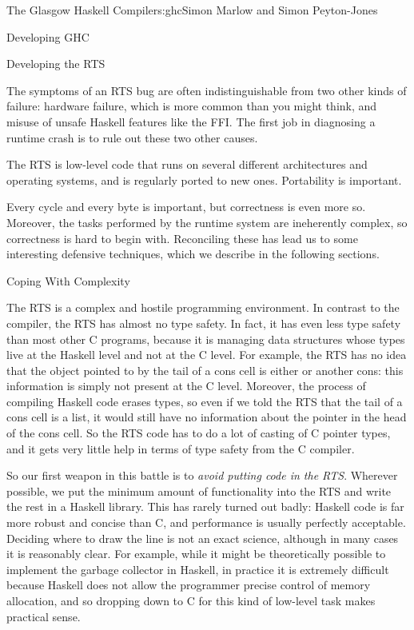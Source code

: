 \begin{aosachapter}{The Glasgow Haskell Compiler}{s:ghc}{Simon Marlow and Simon Peyton-Jones}
\begin{aosasect1}{Developing GHC}
\begin{aosasect2}{Developing the RTS}
\begin{aosaenumerate}
  The symptoms of an RTS bug are often indistinguishable from two
  other kinds of failure: hardware failure, which is more common than
  you might think, and misuse of unsafe Haskell features like the FFI.
  The first job in diagnosing a runtime crash is to rule out these two
  other causes.

\item The RTS is low-level code that runs on several different
  architectures and operating systems, and is regularly ported to new
  ones.  Portability is important.

\end{aosaenumerate}

Every cycle and every byte is important, but correctness is even more
so.  Moreover, the tasks performed by the runtime system are
ineherently complex, so correctness is hard to begin with.
Reconciling these has lead us to some interesting defensive
techniques, which we describe in the following sections.

\begin{aosasect3}{Coping With Complexity}
\label{s:rtsbugs}

The RTS is a complex and hostile programming environment.  In contrast
to the compiler, the RTS has almost no type safety.  In fact, it has
even less type safety than most other C programs, because it is
managing data structures whose types live at the Haskell level and not
at the C level.  For example, the RTS has no idea that the object
pointed to by the tail of a cons cell is either \code{[]} or another
cons: this information is simply not present at the C level.
Moreover, the process of compiling Haskell code erases types, so even
if we told the RTS that the tail of a cons cell is a list, it would
still have no information about the pointer in the head of the cons
cell.  So the RTS code has to do a lot of casting of C pointer types,
and it gets very little help in terms of type safety from the C
compiler.

So our first weapon in this battle is to \emph{avoid putting code in
  the RTS}.  Wherever possible, we put the minimum amount of
functionality into the RTS and write the rest in a Haskell library.
This has rarely turned out badly: Haskell code is far more robust and
concise than C, and performance is usually perfectly acceptable.
Deciding where to draw the line is not an exact science, although in
many cases it is reasonably clear.  For example, while it might be
theoretically possible to implement the garbage collector in Haskell,
in practice it is extremely difficult because Haskell does not allow
the programmer precise control of memory allocation, and so dropping
down to C for this kind of low-level task makes practical sense.


\end{aosasect3}
\end{aosasect2}
\end{aosasect1}
\end{aosachapter}
